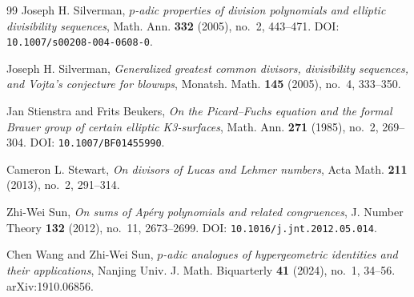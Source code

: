 \documentclass[11pt]{amsart}
\theoremstyle{plain}
\theoremstyle{remark}
\begin{document}
\begin{thebibliography}{99}
Joseph H. Silverman,
\emph{$p$-adic properties of division polynomials and elliptic
divisibility sequences},
Math. Ann. \textbf{332} (2005), no.~2, 443--471.
DOI: \texttt{10.1007/s00208-004-0608-0}.

Joseph H. Silverman,
\emph{Generalized greatest common divisors, divisibility sequences,
and Vojta's conjecture for blowups},
Monatsh. Math. \textbf{145} (2005), no.~4, 333--350.

Jan Stienstra and Frits Beukers,
\emph{On the Picard--Fuchs equation and the formal Brauer group of
certain elliptic K3-surfaces},
Math. Ann. \textbf{271} (1985), no.~2, 269--304.
DOI: \texttt{10.1007/BF01455990}.

Cameron L. Stewart,
\emph{On divisors of Lucas and Lehmer numbers},
Acta Math. \textbf{211} (2013), no.~2, 291--314.

Zhi-Wei Sun,
\emph{On sums of Ap\'ery polynomials and related congruences},
J. Number Theory \textbf{132} (2012), no.~11, 2673--2699.
DOI: \texttt{10.1016/j.jnt.2012.05.014}.

Chen Wang and Zhi-Wei Sun,
\emph{$p$-adic analogues of hypergeometric identities and their
applications},
Nanjing Univ. J. Math. Biquarterly \textbf{41} (2024), no.~1, 34--56.
arXiv:1910.06856.

\end{thebibliography}
\end{document}
